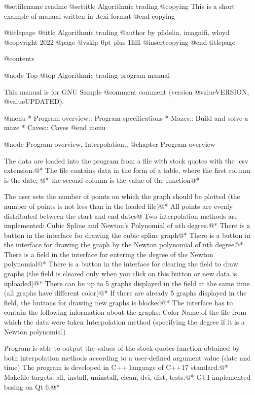 
@setfilename readme
@settitle Algorithmic trading
@copying
This is a short example of manual written in .texi format
@end copying

@titlepage
@title Algorithmic trading
@author by pfidelia, imagnifi, wloyd @copyright{} 2022
@page
@vskip 0pt plus 1filll
@insertcopying
@end titlepage

@contents

@node Top
@top Algorithmic trading program manual

This manual is for GNU Sample
@comment comment (version @value{VERSION}, @value{UPDATED}).

@menu
* Program overview::    Program specifications
* Mazes::    Build and solve a maze
* Caves::    Caves
@end menu

@node Program overview, Interpolation,,
@chapter Program overview

The data are loaded into the program from a file with stock quotes with the .csv extension.@*
The file contains data in the form of a table, where the first column is the date, @*
the second column is the value of the function@*

The user sets the number of points on which the graph should be plotted (the number of points is not less than in the loaded file)@*
All points are evenly distributed between the start and end dates@
Two interpolation methods are implemented: Cubic Spline and Newton's Polynomial of nth degree.@*
There is a button in the interface for drawing the cubic spline graph@*
There is a button in the interface for drawing the graph by the Newton polynomial of nth degree@*
There is a field in the interface for entering the degree of the Newton polynomial@*
There is a button in the interface for clearing the field to draw graphs (the field is cleared only when you click on this button or new data is uploaded)@*
There can be up to 5 graphs displayed in the field at the same time (all graphs have different color)@*
If there are already 5 graphs displayed in the field, the buttons for drawing new graphs is blocked@*
The interface has to contain the following information about the graphs:
Color
Name of the file from which the data were taken
Interpolation method (specifying the degree if it is a Newton polynomial)

Program is able to output the values of the stock quotes function obtained by both interpolation methods according to a user-defined argument value (date and time)
The program is developed in C++ language of C++17 standard.@*
Makefile targets: all, install, uninstall, clean, dvi, dist, tests.@*
GUI implemented basing on Qt 6.@*

